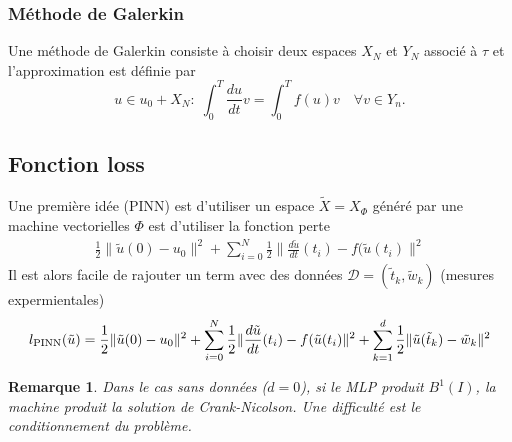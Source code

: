 \documentclass[11pt,a4paper]{article}
\newcommand{\norm}[1]{\|#1\|}
\newtheorem{remark}[theorem]{Remarque}
\begin{document}
\subsubsection{Méthode de Galerkin}
%
Une méthode de Galerkin consiste à choisir deux espaces $X_N$ et $Y_N$ associé à $\tau$ et l'approximation est définie par
%
\begin{equation}\label{equation:}
u\in u_0+X_N :\;\int_0^T \frac{du}{dt} v =  \int_0^T f(u) v\quad \forall v\in Y_n.
\end{equation}
%
%
\subsection{Fonction loss}\label{subsec:}
%
Une première idée  (PINN) est d'utiliser un espace $\tilde X=X_{\Phi}$ généré par une machine vectorielles $\Phi$ est d'utiliser la fonction perte
\begin{align*}
\frac12\norm{\tilde u(0)-u_0}^2 + \sum_{i=0}^N \frac12\norm{\frac{d\tilde u}{dt}(t_i) - f(\tilde u(t_i)}^2
\end{align*}
Il est alors facile de rajouter un term avec des données $\mathcal D=(\tilde t_k, \tilde w_k)$ (mesures expermientales)
\begin{align*}
l_{\rm PINN}(\tilde u) = \frac12\norm{\tilde u(0)-u_0}^2 + \sum_{i=0}^N \frac12\norm{\frac{d\tilde u}{dt}(t_i) - f(\tilde u(t_i)}^2 + \sum_{k=1}^d \frac12\norm{\tilde u(\tilde t_k) - \tilde w_k}^2
\end{align*}
%
%
\begin{remark}\label{remark:}
Dans le cas sans données ($d=0$), si le MLP produit $B^1(I)$, la machine produit la solution de Crank-Nicolson. Une difficulté est 
le conditionnement du problème.
\end{remark}
%
%
\end{document}

